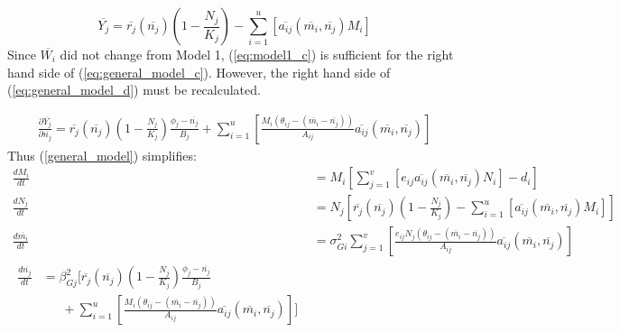 \documentclass{amsart}
\theoremstyle{definition}
\theoremstyle{remark}
\numberwithin{equation}{section}
\begin{document}
\begin{equation}
	\label{model_2_avg_prey_fitness}
	\overline{Y_j} = \overline{r_j}(\overline{n_j})\left(1 - \frac{N_j}{K_j}\right) - \sum\limits_{i = 1}^{u}\left[\overline{a_{ij}}(\overline{m_i}, \overline{n_j})M_i\right]
\end{equation}
Since $\overline{W_i}$ did not change from Model 1, (\ref{eq:model1_c}) is sufficient for the right hand side of (\ref{eq:general_model_c}).  However, the right hand side of (\ref{eq:general_model_d}) must be recalculated.

\begin{equation}
	\label{model_2_prey_fitness_partial}
	\begin{aligned}
		\frac{\partial \overline{Y_j}}{\partial \overline{n_j}} = \overline{r_j}(\overline{n_j})\left(1 - \frac{N_j}{K_j}\right)\frac{\phi_j - \overline{n_j}}{B_j} + \sum\limits_{i = 1}^{u}\left[\frac{M_i(\theta_{ij} - (\overline{m_i} - \overline{n_j}))}{A_{ij}}\overline{a_{ij}}(\overline{m_i}, \overline{n_j})\right]
	\end{aligned}
\end{equation}
Thus (\ref{general_model}) simplifies:
\begin{subequations}
	\label{model2}
	\begin{align}
		\label{eq:model2_a}
		\frac{dM_i}{dt} &= M_i\left[\sum\limits_{j = 1}^{v}\left[e_{ij}\overline{a_{ij}}(\overline{m_i}, \overline{n_j})N_i\right] - d_i\right] \\[5px]
		\label{eq:model2_b}
		\frac{dN_j}{dt} &= N_j\left[\overline{r_j}(\overline{n_j})\left(1 - \frac{N_j}{K_j}\right) - \sum\limits_{i = 1}^{u}\left[\overline{a_{ij}}(\overline{m_i}, \overline{n_j})M_i\right]\right] \\[5px]
		\label{eq:model2_c}
		\frac{d\overline{m_i}}{dt} &= \sigma_{Gi}^2\sum\limits_{j = 1}^{v}\left[\frac{e_{ij}N_j(\theta_{ij} - (\overline{m_i} - \overline{n_j}))}{A_{ij}}\overline{a_{ij}}(\overline{m_i}, \overline{n_j})\right] \\[5px]
		\label{eq:model2_d}
		\begin{split}
			\frac{d\overline{n_j}}{dt} &= \beta_{Gj}^2\Bigg[\overline{r_j}(\overline{n_j})\left(1 - \frac{N_j}{K_j}\right)\frac{\phi_j - \overline{n_j}}{B_j} \\
			&\ \ \ \ \ \ \ + \sum\limits_{i = 1}^{u}\left[\frac{M_i(\theta_{ij} - (\overline{m_i} - \overline{n_j}))}{A_{ij}}\overline{a_{ij}}(\overline{m_i}, \overline{n_j})\right]\Bigg]
		\end{split}
	\end{align}
\end{subequations}
\end{document}
